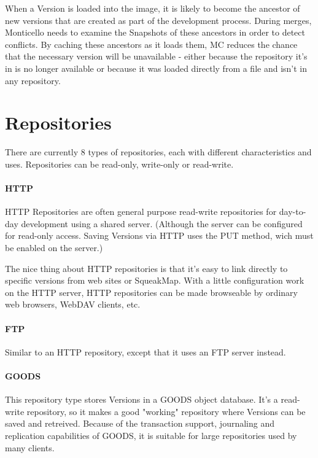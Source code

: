 \documentclass[a4paper,10pt,twoside]{book}
\begin{document}
When a Version is loaded into the image, it is likely to become the ancestor of new versions that are created as part of the development process. During merges, Monticello needs to examine the Snapshots of these ancestors in order to detect conflicts. By caching these ancestors as it loads them, MC reduces the chance that the necessary version will be unavailable - either because the repository it's in is no longer available or because it was loaded directly from a file and isn't in any repository.



\section{Repositories}

There are currently 8 types of repositories, each with different characteristics and uses. Repositories can be read-only, write-only or read-write.

\paragraph{HTTP}

HTTP Repositories are often general purpose read-write repositories for day-to-day development using a shared server. (Although the server can be configured for read-only access. Saving Versions via HTTP uses the PUT method, wich must be enabled on the server.)

The nice thing about HTTP repositories is that it's easy to link directly to specific versions from web sites or SqueakMap. With a little configuration work on the HTTP server, HTTP repositories can be made browseable by ordinary web browsers, WebDAV clients, etc.

\paragraph{FTP}

Similar to an HTTP repository, except that it uses an FTP server instead.

\paragraph{GOODS}

This repository type stores Versions in a GOODS object database. It's a read-write repository, so it makes a good "working" repository where Versions can be saved and retreived. Because of the transaction support, journaling and replication capabilities of GOODS, it is suitable for large repositories used by many clients.
\end{document}
